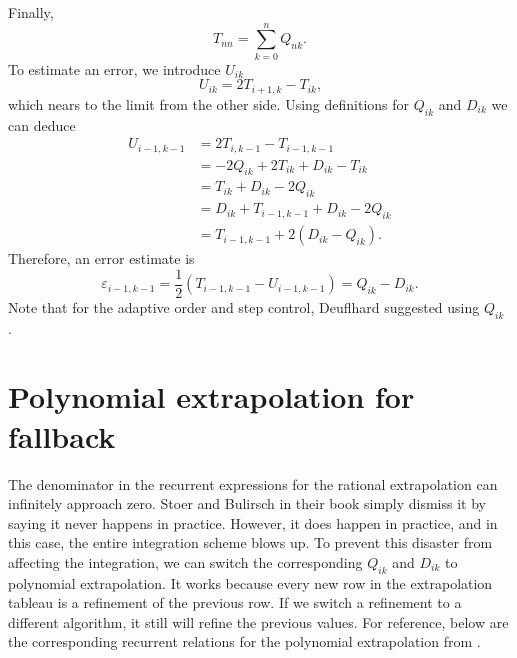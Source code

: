 \documentclass[11pt, twoside, twocolumn, paper = letter]{scrartcl}
\begin{document}
Finally,
\begin{equation*}
    T_{nn} = \sum_{k = 0}^n{Q_{nk}}
    \text{.}
\end{equation*}
To estimate an error, we introduce $U_{ik}$
\begin{equation*}
    U_{ik} = 2T_{i + 1, k} - T_{ik}
    \text{,}
\end{equation*}
which nears to the limit from the other side. Using definitions for $Q_{ik}$ and $D_{ik}$ we can
deduce
\begin{equation*}
    \begin{split}
        U_{i-1, k - 1} &= 2 T_{i, k - 1} - T_{i - 1, k - 1}\\
                       &= -2 Q_{ik} + 2 T_{ik} + D_{ik} - T_{ik}\\
                       &= T_{ik} + D_{ik} - 2 Q_{ik}\\
                       &= D_{ik} + T_{i - 1, k - 1} + D_{ik} - 2 Q_{ik}\\
                       &= T_{i - 1, k - 1} + 2\left(D_{ik} - Q_{ik}\right)\text{.}
    \end{split}
\end{equation*}
Therefore, an error estimate is
\begin{equation*}
    \varepsilon_{i - 1, k - 1}
      = \frac{1}{2}\left(T_{i-1, k - 1} - U_{i - 1, k - 1}\right) = Q_{ik} - D_{ik}
    \text{.}
\end{equation*}
Note that for the adaptive order and step control, Deuflhard suggested using $Q_{ik}$
\cite{Deuflhard1983}.

\section{Polynomial extrapolation for fallback}

The denominator in the recurrent expressions for the rational extrapolation can infinitely approach
zero. Stoer and Bulirsch in their book \cite{BulirschStoerBook} simply dismiss it by saying it never
happens in practice. However, it does happen in practice, and in this case, the entire integration
scheme blows up. To prevent this disaster from affecting the integration, we can switch the
corresponding $Q_{ik}$ and $D_{ik}$ to polynomial extrapolation. It works because every new row in
the extrapolation tableau is a refinement of the previous row. If we switch a refinement to a
different algorithm, it still will refine the previous values. For reference, below are the
corresponding recurrent relations for the polynomial extrapolation from \cite{BulirschStoerBook}.
\end{document}
